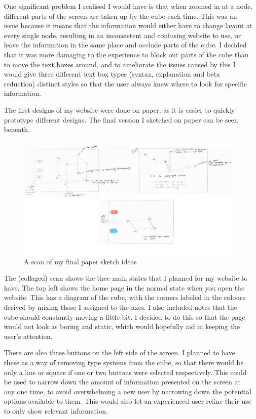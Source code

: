 \documentclass{l4proj}
\begin{document}
One significant problem I realised I would have is that when zoomed in at a node, different parts of the screen are taken up by the cube each time.  This was an issue because it means that the information would either have to change layout at every single node, resulting in an inconsistent and confusing website to use, or leave the information in the same place and occlude parts of the cube.  I decided that it was more damaging to the experience to block out parts of the cube than to move the text boxes around, and to ameliorate the issues caused by this I would give three different text box types (syntax, explanation and beta reduction) distinct styles so that the user always knew where to look for specific information.

The first designs of my website were done on paper, as it is easier to quickly prototype different designs.  The final version I sketched on paper can be seen beneath.

\begin{figure}[h!]
    \centering
    \includegraphics[width=1\linewidth]{dissertation/images/paper_collaged_taller.png}
    \caption{A scan of my final paper sketch ideas}
    \label{fig:enter-label}
\end{figure}

The (collaged) scan shows the thee main states that I planned for my website to have.  The top left shows the home page in the normal state when you open the website.  This has a diagram of the cube, with the corners labeled in the colours derived by mixing those I assigned to the axes.  I also included notes that the cube should constantly moving a little bit.  I decided to do this so that the page would not look as boring and static, which would hopefully aid in keeping the user's attention.  

There are also three buttons on the left side of the screen.  I planned to have these as a way of removing type systems from the cube, so that there would be only a line or square if one or two buttons were selected respectively.  This could be used to narrow down the amount of information presented on the screen at any one time, to avoid overwhelming a new user by narrowing down the potential options available to them.  This would also let an experienced user refine their use to only show relevant information.
\pagebreak
\end{document}
